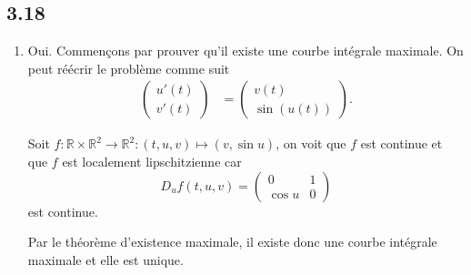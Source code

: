 \documentclass{article}
\begin{document}
\subsection*{3.18}
\begin{enumerate}
  \item Oui. Commençons par prouver qu'il existe une courbe intégrale maximale.
    On peut réécrir le problème comme suit
    \begin{align*}
      \begin{pmatrix}
        u'(t)\\
        v'(t)
      \end{pmatrix} & =
      \begin{pmatrix}
        v(t)\\
        \sin(u(t))
      \end{pmatrix}.
    \end{align*}

    Soit $f:\mathbb{R}\times\mathbb{R}^2\to\mathbb{R}^2:
    (t,u,v)\mapsto(v,\sin u)$, on voit que $f$ est continue et que
    $f$ est localement lipschitzienne car
    \[ D_uf(t,u,v) =
    \begin{pmatrix}
      0 & 1\\
      \cos u & 0
    \end{pmatrix} \]
    est continue.

    Par le théorème d'existence maximale, il existe donc une courbe intégrale
    maximale et elle est unique.


\end{enumerate}
\end{document}
